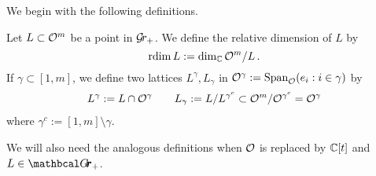 \documentclass{article} %
\begin{document}
We begin with the following definitions.
\begin{definition}
Let $ L \subset \mathcal O^m$ be a point in $ \mathcal{G}\!r_+$.  We define the relative dimension of $L $ by
$$
\operatorname{rdim} L := \dim_\mathbb C \mathcal O^m/L\,. 
$$
% 
If $ \gamma \subset [1,m]$, we define two lattices $ L^\gamma, L_\gamma $ in $ \mathcal O^\gamma := \operatorname{Span}_{\mathcal O}(e_i : i \in \gamma) $ by
\begin{gather*}
L^\gamma:= L \cap \mathcal O^\gamma  \qquad L_\gamma := L / L^{\gamma^c} \subset \mathcal O^m / \mathcal O^{\gamma^c} = \mathcal O^\gamma
\end{gather*}
where $ \gamma^c := [1,m] \setminus \gamma$.
% 
\end{definition}
We will also need the analogous definitions when $ \mathcal O$ is replaced by $ \mathbb C[t]$ and $L \in \Grth_+$.
\end{document}
